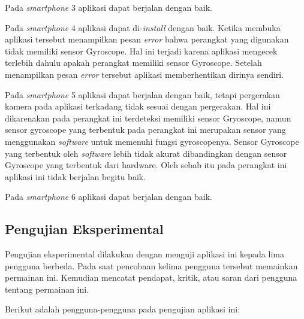 Pada \textit{smartphone} 3 aplikasi dapat berjalan dengan baik.

Pada \textit{smartphone} 4 aplikasi dapat di-\textit{install} dengan baik. Ketika membuka aplikasi tersebut menampilkan pesan \textit{error} bahwa perangkat yang digunakan tidak memiliki sensor Gyroscope. Hal ini terjadi karena aplikasi mengecek terlebih dahulu apakah perangkat memiliki sensor Gyroscope. Setelah menampilkan pesan \textit{error} tersebut aplikasi memberhentikan dirinya sendiri. 

Pada \textit{smartphone} 5 aplikasi dapat berjalan dengan baik, tetapi pergerakan kamera pada aplikasi terkadang tidak sesuai dengan pergerakan. Hal ini dikarenakan pada perangkat ini terdeteksi memiliki sensor Gryoscope, namun sensor gyroscope yang terbentuk pada perangkat ini merupakan sensor yang menggunakan \textit{software} untuk memenuhi fungsi gyroscopenya. Sensor Gyroscope yang terbentuk oleh \textit{software} lebih tidak akurat dibandingkan dengan sensor Gyroscope yang terbentuk dari hardware. Oleh sebab itu pada perangkat ini aplikasi ini tidak berjalan begitu baik. 

Pada \textit{smartphone} 6 aplikasi dapat berjalan dengan baik.

\subsection{Pengujian Eksperimental}

Pengujian eksperimental dilakukan dengan menguji aplikasi ini kepada lima pengguna berbeda. Pada saat pencobaan kelima pengguna tersebut memainkan permainan ini. Kemudian mencatat pendapat, kritik, atau saran dari pengguna tentang permainan ini. 

Berikut adalah pengguna-pengguna pada pengujian aplikasi ini:

